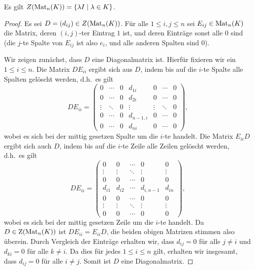 \documentclass[a4paper, 10pt, numbers=noenddot]{scrartcl}
\begin{document}
\begin{lemma}
  Es gilt $Z(\operatorname{Mat}_n(K)) = \{ \lambda I \mid \lambda \in K\}$.
\end{lemma}
\begin{proof}
  Es sei $D = (d_{ij}) \in Z(\operatorname{Mat}_n(K))$.
  Für alle $1 \leq i,j \leq n$ sei $E_{ij} \in \operatorname{Mat}_n(K)$ die Matrix, deren $(i,j)$-ter Eintrag $1$ ist, und deren Einträge sonst alle $0$ sind (die $j$-te Spalte von $E_{ij}$ ist also $e_i$, und alle anderen Spalten sind $0$).
  
  Wir zeigen zunächst, dass $D$ eine Diagonalmatrix ist.
  Hierfür fixieren wir ein $1 \leq i \leq n$.
  Die Matrix $D E_{ii}$ ergibt sich aus $D$, indem bis auf die $i$-te Spalte alle Spalten gelöscht werden, d.h.\ es gilt
  \[
      D E_{ii}
    = \begin{pmatrix}
        0       & \cdots  & 0 & d_{1i}    & 0       & \cdots  & 0  \\
        0       & \cdots  & 0 & d_{2i}    & 0       & \cdots  & 0  \\
        \vdots  & \ddots  & 0 & \vdots    & \vdots  & \ddots  & 0  \\
        0       & \cdots  & 0 & d_{n-1,i} & 0       & \cdots  & 0  \\
        0       & \cdots  & 0 & d_{ni}    & 0       & \cdots  & 0
      \end{pmatrix},
  \]
  wobei es sich bei der mittig gesetzen Spalte um die $i$-te handelt.
  Die Matrix $E_{ii} D$ ergibt sich auch $D$, indem bis auf die $i$-te Zeile alle Zeilen gelöscht werden, d.h.\ es gilt
  \[
      D E_{ii}
    = \begin{pmatrix}
        0       & 0       & \cdots  & 0         & 0       \\
        \vdots  & \vdots  & \ddots  & \vdots    & \vdots  \\
        0       & 0       & \cdots  & 0         & 0       \\
        d_{i1}  & d_{i2}  & \cdots  & d_{i,n-1} & d_{in}  \\
        0       & 0       & \cdots  & 0         & 0       \\
        \vdots  & \vdots  & \ddots  & \vdots    & \vdots  \\
        0       & 0       & \cdots  & 0         & 0
      \end{pmatrix},
  \]
  wobei es sich bei der mittig gesetzen Zeile um die $i$-te handelt.
  Da $D \in \operatorname{Z}(\operatorname{Mat}_n(K))$ ist $D E_{ii} = E_{ii} D$, die beiden obigen Matrizen stimmen also überein.
  Durch Vergleich der Einträge erhalten wir, dass $d_{ij} = 0$ für alle $j \neq i$ und $d_{ki} = 0$ für alle $k \neq i$.
  Da dies für jedes $1 \leq i \leq n$ gilt, erhalten wir insgesamt, dass $d_{ij} = 0$ für alle $i \neq j$.
  Somit ist $D$ eine Diagonalmatrix.
  

\end{proof}
\end{document}
